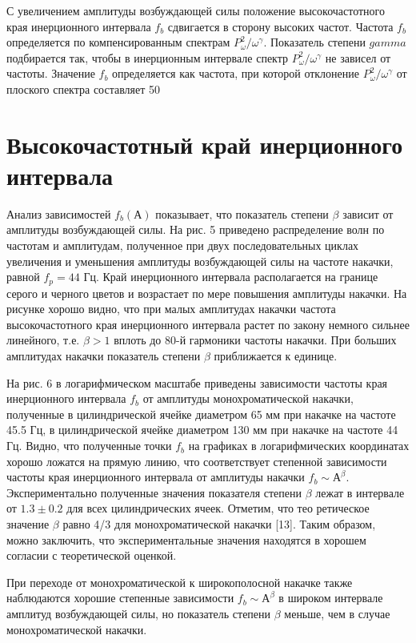 С увеличением амплитуды возбуждающей силы положение высокочастотного края инерционного интервала $f_b$ сдвигается в сторону высоких частот. Частота $f_b$ определяется по компенсированным спектрам $P_\omega^2/\omega^\gamma$. Показатель степени $gamma$ подбирается так, чтобы в инерционным интервале спектр $P_\omega^2/\omega^\gamma$ не зависел от частоты. Значение $f_b$ определяется как частота, при которой отклонение $P_\omega^2/\omega^\gamma$ от плоского спектра составляет 50%
\section{Высокочастотный край инерционного интервала} \label{sect2_3}

Анализ зависимостей $f_b(А)$ показывает, что показатель степени $\beta$ зависит от амплитуды возбуждающей силы. На рис. 5 приведено распределение волн по частотам и амплитудам, полученное при двух последовательных циклах увеличения и уменьшения амплитуды возбуждающей силы на частоте накачки, равной $f_p = 44$ Гц. Край инерционного интервала располагается на границе серого и черного цветов и возрастает по мере повышения амплитуды накачки. На рисунке хорошо видно, что при малых амплитудах накачки частота высокочастотного края инерционного интервала растет по закону немного сильнее линейного, т.е. $\beta > 1$ вплоть до 80-й гармоники частоты накачки. При больших амплитудах накачки показатель степени $\beta$ приближается к единице.

На рис. 6 в логарифмическом масштабе приведены зависимости частоты края инерционного интервала $f_b$ от амплитуды монохроматической накачки, полученные в цилиндрической ячейке диаметром 65 мм при накачке на частоте 45.5 Гц, в цилиндрической ячейке диаметром 130 мм при накачке на частоте 44 Гц. Видно, что полученные точки $f_b$ на графиках в логарифмических координатах хорошо ложатся на прямую линию, что соответствует степенной зависимости частоты края инерционного интервала от амплитуды накачки $f_b \sim А^\beta$. Экспериментально полученные значения показателя степени $\beta$ лежат в интервале от $1.3 \pm 0.2$ для всех цилиндрических ячеек. Отметим, что тео ретическое значение $\beta$ равно 4/3 для монохроматической накачки [13]. Таким образом, можно заключить, что экспериментальные значения находятся в хорошем согласии с теоретической оценкой.

При переходе от монохроматической к широкополосной накачке также наблюдаются хорошие степенные зависимости $f_b \sim А^\beta$ в широком интервале амплитуд возбуждающей силы, но показатель степени $\beta$ меньше, чем в случае монохроматической накачки.

